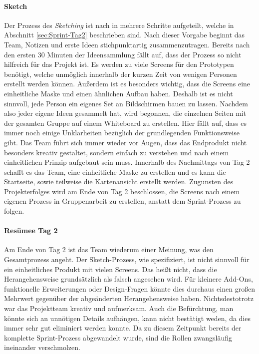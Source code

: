 \paragraph{Sketch}
\label{ref:Sprint-Umsetzung-Sketch}
Der Prozess des \textit{Sketching} ist nach \citeauthor{Sprint} in mehrere Schritte aufgeteilt, welche in Abschnitt \ref{sec:Sprint-Tag2} beschrieben sind. Nach dieser Vorgabe beginnt das Team, Notizen und erste Ideen stichpunktartig zusammenzutragen. Bereits nach den ersten 30 Minuten der Ideensammlung fällt auf, dass der Prozess so nicht hilfreich für das Projekt ist. Es werden zu viele Screens für den Prototypen benötigt, welche unmöglich innerhalb der kurzen Zeit von wenigen Personen erstellt werden können. Außerdem ist es besonders wichtig, dass die Screens eine einheitliche Maske und einen ähnlichen Aufbau haben. Deshalb ist es nicht sinnvoll, jede Person ein eigenes Set an Bildschirmen bauen zu lassen. Nachdem also jeder eigene Ideen gesammelt hat, wird begonnen, die einzelnen Seiten mit der gesamten Gruppe auf einem Whiteboard zu erstellen. Hier fällt auf, dass es immer noch einige Unklarheiten bezüglich der grundlegenden Funktionsweise gibt. Das Team führt sich immer wieder vor Augen, dass das Endprodukt nicht besonders kreativ gestaltet, sondern einfach zu verstehen und nach einem einheitlichen Prinzip aufgebaut sein muss. Innerhalb des Nachmittags von Tag 2 schafft es das Team, eine einheitliche Maske zu erstellen und es kann die Startseite, sowie teilweise die Kartenansicht erstellt werden.
Zugunsten des Projekterfolges wird am Ende von Tag 2 beschlossen, die Screens nach einem eigenen Prozess in Gruppenarbeit zu erstellen, anstatt dem Sprint-Prozess zu folgen.

\paragraph{Resümee Tag 2}
Am Ende von Tag 2 ist das Team wiederum einer Meinung, was den Gesamtprozess angeht. Der Sketch-Prozess, wie spezifiziert, ist nicht sinnvoll für ein einheitliches Produkt mit vielen Screens. Das heißt nicht, dass die Herangehensweise grundsätzlich als falsch angesehen wird. Für kleinere Add-Ons, funktionelle Erweiterungen oder Design-Fragen könnte dies durchaus einen großen Mehrwert gegenüber der abgeänderten Herangehensweise haben. Nichtsdestotrotz war das Projektteam kreativ und aufmerksam.  Auch die Befürchtung, man könnte sich an unnötigen Details aufhängen, kann nicht bestätigt weden, da dies immer sehr gut eliminiert werden konnte. Da zu diesem Zeitpunkt bereits der komplette Sprint-Prozess abgewandelt wurde, sind die Rollen zwangsläufig ineinander verschmolzen.

